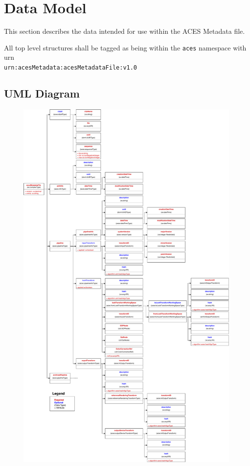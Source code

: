 \regularsectionformat	%

\newcommand{\xmlfield}[3]{
	\TabPositions{2em,1.75in,2.5in,2.6in}
	\tab\texttt{#1} \tab#2 \tab// #3	 \par
}

\chapter{Data Model}

This section describes the data intended for use within the ACES Metadata file.

All top level structures shall be tagged as being within the \texttt{aces} namespace with urn \\ \texttt{urn:acesMetadata:acesMetadataFile:v1.0}

\section{UML Diagram}
\begin{figure}[H]
  \centering
  \includegraphics[height=7.5in]{./images/amfUML.pdf}
\end{figure}
\newpage

